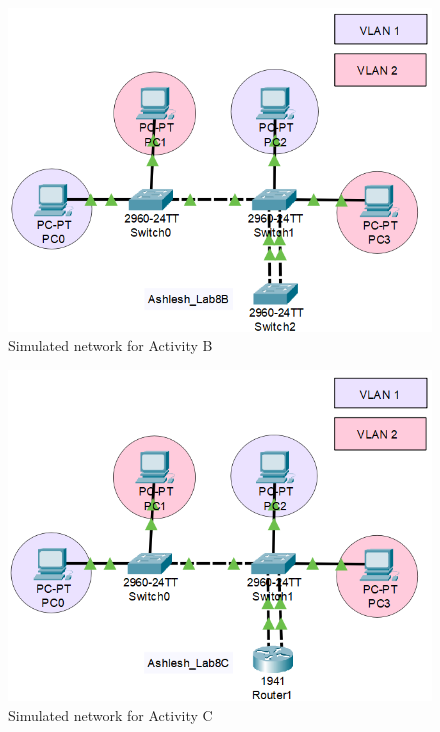 \documentclass{lab_sheet}
\begin{document}
\begin{figure}[H]
	\centering
	\includegraphics[scale=.9]{Figures/activityb.png}
	\caption{Simulated network for Activity B}
	\label{fig:activityb}
\end{figure}

\begin{figure}[H]
	\centering
	\includegraphics[scale=.9]{Figures/activityc.png}
	\caption{Simulated network for Activity C}
	\label{fig:activityc}
\end{figure}
\end{document}
